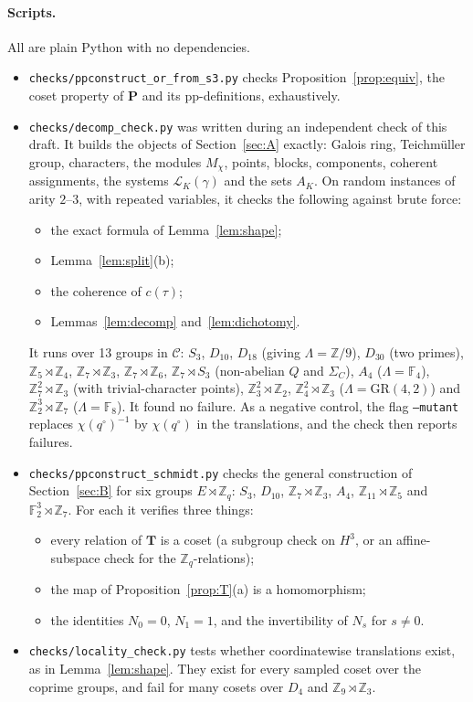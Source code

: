 \documentclass[11pt]{article}
\theoremstyle{definition}
\theoremstyle{remark}
\newcommand{\Z}{\mathbb Z}
\newcommand{\cL}{\mathcal L}
\begin{document}
\paragraph{Scripts.} All are plain Python with no dependencies.
\begin{itemize}
\item \texttt{checks/ppconstruct\_or\_from\_s3.py} checks
Proposition~\ref{prop:equiv}, the coset property of $\mathbf P$ and its
pp-definitions, exhaustively.
\item \texttt{checks/decomp\_check.py} was written during an independent check of
this draft. It builds the objects of Section~\ref{sec:A} exactly: Galois ring,
Teichmüller group, characters, the modules $M_\chi$, points, blocks, components,
coherent assignments, the systems $\cL_K(\gamma)$ and the sets $A_K$. On random
instances of arity $2$--$3$, with repeated variables, it checks the following
against brute force:
\begin{itemize}
\item the exact formula of Lemma~\ref{lem:shape};
\item Lemma~\ref{lem:split}(b);
\item the coherence of $c(\tau)$;
\item Lemmas~\ref{lem:decomp} and~\ref{lem:dichotomy}.
\end{itemize}
It runs over 13 groups in $\mathcal C$: $S_3$, $D_{10}$, $D_{18}$ (giving
$\Lambda=\Z/9$), $D_{30}$ (two primes), $\Z_5\rtimes\Z_4$, $\Z_7\rtimes\Z_3$,
$\Z_7\rtimes\Z_6$, $\Z_7\rtimes S_3$ (non-abelian $Q$ and $\Sigma_C$), $A_4$
($\Lambda=\mathbb F_4$), $\Z_7^2\rtimes\Z_3$ (with trivial-character points),
$\Z_3^2\rtimes\Z_2$, $\Z_4^2\rtimes\Z_3$ ($\Lambda=\mathrm{GR}(4,2)$) and
$\Z_2^3\rtimes\Z_7$ ($\Lambda=\mathbb F_8$). It found no failure. As a
negative control, the flag \texttt{--mutant} replaces $\chi(q^\circ)^{-1}$ by
$\chi(q^\circ)$ in the translations, and the check then reports failures.
\item \texttt{checks/ppconstruct\_schmidt.py} checks the general construction of
Section~\ref{sec:B} for six groups $E\rtimes\Z_q$: $S_3$, $D_{10}$,
$\Z_7\rtimes\Z_3$, $A_4$, $\Z_{11}\rtimes\Z_5$ and $\mathbb F_2^3\rtimes\Z_7$. For
each it verifies three things:
\begin{itemize}
\item every relation of $\mathbf T$ is a coset (a subgroup check on $H^3$, or an
affine-subspace check for the $\Z_q$-relations);
\item the map of Proposition~\ref{prop:T}(a) is a homomorphism;
\item the identities $N_0=0$, $N_1=1$, and the invertibility of $N_s$ for
$s\ne0$.
\end{itemize}
\item \texttt{checks/locality\_check.py} tests whether coordinatewise
translations exist, as in Lemma~\ref{lem:shape}. They exist for every sampled
coset over the coprime groups, and fail for many cosets over $D_4$ and
$\Z_9\rtimes\Z_3$.
\end{itemize}
\end{document}
